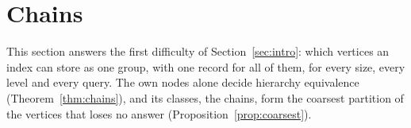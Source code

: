 \section{Chains}\label{sec:chains}

This section answers the first difficulty of Section~\ref{sec:intro}: which vertices an index can store as one group, with one record for all of them, for every size, every level and every query.
%
The own nodes alone decide hierarchy equivalence (Theorem~\ref{thm:chains}), and its classes, the chains, form the coarsest partition of the vertices that loses no answer (Proposition~\ref{prop:coarsest}).

